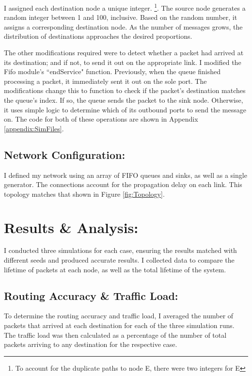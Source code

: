 \documentclass{article}
\begin{document}
I assigned each destination node a unique integer. \footnote{To account for the duplicate paths to node E, there were two integers for E}.
The source node generates a random integer between 1 and 100, inclusive.  Based on the random number, it assigns a corresponding destination node.
As the number of messages grows, the distribution of destinations approaches the desired proportions.

The other modifications required were to detect whether a packet had arrived at its destination; and if not, to send it out on the appropriate link.
I modified the Fifo module's ``endService" function.
Previously, when the queue finished processing a packet, it immediately sent it out on the sole port.
The modifications change this to function to check if the packet's destination matches the queue's index.  
If so, the queue sends the packet to the sink node.
Otherwise, it uses simple logic to determine which of its outbound ports to send the message on.
The code for both of these operations are shown in Appendix \ref{appendix:SimFiles}.

\subsection{Network Configuration:}  
\label{subsec:Config}
I defined my network using an array of FIFO queues and sinks, as well as a single generator.
The connections account for the propagation delay on each link.
This topology matches that shown in Figure \ref{fig:Topology}.

\section{Results \& Analysis:}
\label{sec:Results}
I conducted three simulations for each case, ensuring the results matched with different seeds and produced accurate results.
I collected data to compare the lifetime of packets at each node, as well as the total lifetime of the system.

\subsection{Routing Accuracy \& Traffic Load:}
\label{subsec:RoutingResults}
To determine the routing accuracy and traffic load, I averaged the number of packets that arrived at each destination for each of the three simulation runs.  
The traffic load was then calculated as a percentage of the number of total packets arriving to any destination for the respective case.
\end{document}
